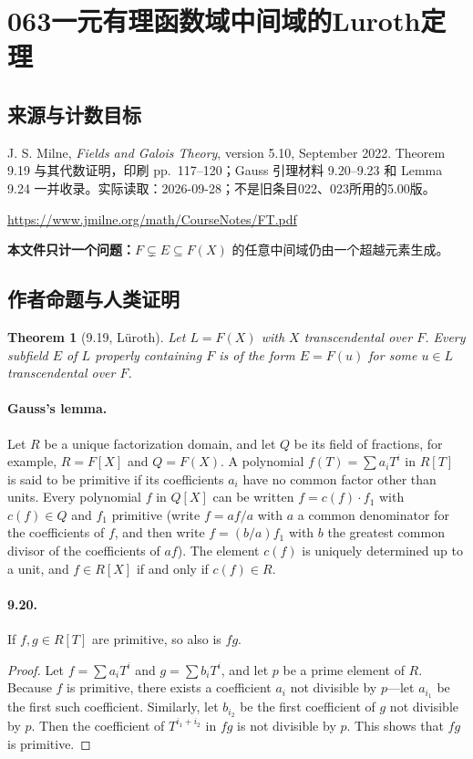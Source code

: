 \documentclass[UTF8,11pt]{ctexart}
\newtheorem*{theorem}{Theorem}
\theoremstyle{definition}
\begin{document}
\section*{063\quad 一元有理函数域中间域的Luroth定理}
\subsection*{来源与计数目标}
J. S. Milne, \emph{Fields and Galois Theory}, version 5.10, September 2022. Theorem 9.19 与其代数证明，印刷 pp.~117--120；Gauss 引理材料 9.20--9.23 和 Lemma 9.24 一并收录。实际读取：2026-09-28；不是旧条目022、023所用的5.00版。
\par\url{https://www.jmilne.org/math/CourseNotes/FT.pdf}
\par\textbf{本文件只计一个问题：}$F\subsetneq E\subseteq F(X)$ 的任意中间域仍由一个超越元素生成。
\subsection*{作者命题与人类证明}
\begin{theorem}[9.19, L\"uroth]
Let $L=F(X)$ with $X$ transcendental over $F$. Every subfield $E$ of $L$ properly containing $F$ is of the form $E=F(u)$ for some $u\in L$ transcendental over $F$.
\end{theorem}
\paragraph{Gauss's lemma.}
Let $R$ be a unique factorization domain, and let $Q$ be its field of fractions, for example, $R=F[X]$ and $Q=F(X)$. A polynomial $f(T)=\sum a_iT^i$ in $R[T]$ is said to be primitive if its coefficients $a_i$ have no common factor other than units. Every polynomial $f$ in $Q[X]$ can be written $f=c(f)\cdot f_1$ with $c(f)\in Q$ and $f_1$ primitive (write $f=af/a$ with $a$ a common denominator for the coefficients of $f$, and then write $f=(b/a)f_1$ with $b$ the greatest common divisor of the coefficients of $af$). The element $c(f)$ is uniquely determined up to a unit, and $f\in R[X]$ if and only if $c(f)\in R$.

\paragraph{9.20.} If $f,g\in R[T]$ are primitive, so also is $fg$.
\begin{proof}
Let $f=\sum a_iT^i$ and $g=\sum b_iT^i$, and let $p$ be a prime element of $R$. Because $f$ is primitive, there exists a coefficient $a_i$ not divisible by $p$---let $a_{i_1}$ be the first such coefficient. Similarly, let $b_{i_2}$ be the first coefficient of $g$ not divisible by $p$. Then the coefficient of $T^{i_1+i_2}$ in $fg$ is not divisible by $p$. This shows that $fg$ is primitive.
\end{proof}
\end{document}
